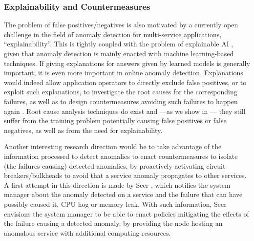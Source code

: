 \subsubsection{Explainability and Countermeasures}
\label{sec:detection:discussion:explainability-countermeasures}
The problem of false positives/negatives is also motivated by a currently open challenge in the field of anomaly detection for multi-service applications, \viz \enquote{explainability}.
This is tightly coupled with the problem of explainable AI \cite{Guidotti2019_Explainability}, given that anomaly detection is mainly enacted with machine learning-based techniques.
If giving explanations for answers given by learned models is generally important, it is even more important in online anomaly detection.
Explanations would indeed allow application operators to directly exclude false positives, or to exploit such explanations, \eg to investigate the root causes for the corresponding failures, as well as to design countermeasures avoiding such failures to happen again \cite{Brogi2020_FailureCausalities}.
Root cause analysis techniques do exist and ---as we show in --- they still suffer from the training problem potentially causing false positives or false negatives, as well as from the need for explainability.

Another interesting research direction would be to take advantage of the information processed to detect anomalies to enact countermeasures to isolate (the failures causing) detected anomalies,
\eg by proactively activating circuit breakers/bulkheads \cite{Richardson2018_MicroservicesPatterns} to avoid that a service anomaly propagates to other services.
%
A first attempt in this direction is made 
by Seer \cite{17_Gan2019_Seer}, which notifies the system manager about the anomaly detected on a service and the failure that can have possibly caused it, \eg CPU hog or memory leak. 
With such information, Seer \cite{17_Gan2019_Seer} envisions the system manager to be able to enact policies mitigating the effects of the failure causing a detected anomaly, \eg by providing the node hosting an anomalous service with additional computing resources.